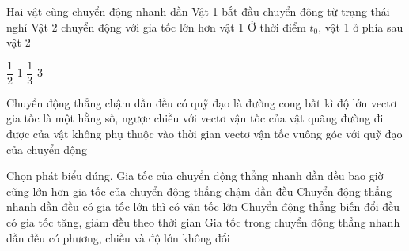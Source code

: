 \begin{ex}
	\choice
	{Hai vật cùng chuyển động nhanh dần}
	{Vật 1 bắt đầu chuyển động từ trạng thái nghỉ}
	{\True Vật 2 chuyển động với gia tốc lớn hơn vật 1}
	{Ở thời điểm $t_0$, vật 1 ở phía sau vật 2}
\end{ex}

\begin{ex}
	\choice
	{$\dfrac{1}{2}$}
	{$1$}
	{\True $\dfrac{1}{3}$}
	{$3$}
\end{ex}
\begin{ex}
	Chuyển động thẳng chậm dần đều có
	\choice
	{quỹ đạo là đường cong bất kì}
	{\True độ lớn vectơ gia tốc là một hằng số, ngược chiều với vectơ vận tốc của vật}
	{quãng đường đi được của vật không phụ thuộc vào thời gian}
	{vectơ vận tốc vuông góc với quỹ đạo của chuyển động}
	\loigiai{}
\end{ex}

\begin{ex}
	Chọn phát biểu đúng.
	\choice
	{Gia tốc của chuyển động thẳng nhanh dần đều bao giờ cũng lớn hơn gia tốc của chuyển động thẳng chậm dần đều}
	{Chuyển động thẳng nhanh dần đều có gia tốc lớn thì có vận tốc lớn}
	{Chuyển động thẳng biến đổi đều có gia tốc tăng, giảm đều theo thời gian}
	{\True Gia tốc trong chuyển động thẳng nhanh dần đều có phương, chiều và độ lớn không đổi}
	\loigiai{}
\end{ex}

